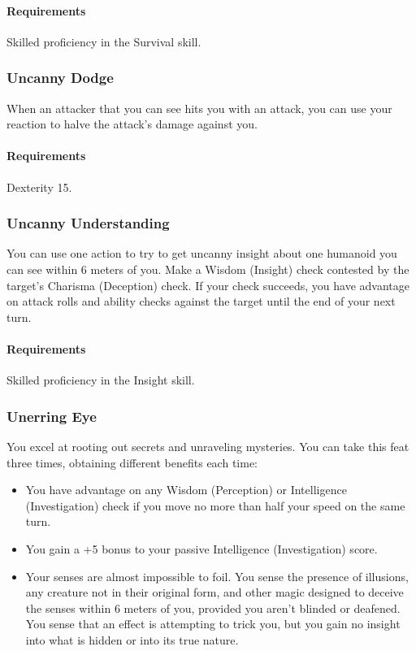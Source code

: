     \paragraph{Requirements} Skilled proficiency in the Survival skill.
\subsubsection{Uncanny Dodge} \label{feat::uncannydodge}
    When an attacker that you can see hits you with an attack, you can use your reaction to halve the attack's damage against you.
    \paragraph{Requirements} Dexterity 15.
\subsubsection{Uncanny Understanding} \label{feat::uncannyinsight}
    You can use one action to try to get uncanny insight about one humanoid you can see within 6 meters of you.
    Make a Wisdom (Insight) check contested by the target's Charisma (Deception) check.
    If your check succeeds, you have advantage on attack rolls and ability checks against the target until the end of your next turn.
    \paragraph{Requirements} Skilled proficiency in the Insight skill.
\subsubsection{Unerring Eye} \label{feat::unerringeye}
    You excel at rooting out secrets and unraveling mysteries.
    You can take this feat three times, obtaining different benefits each time:
    \begin{itemize}
        \item You have advantage on any Wisdom (Perception) or Intelligence (Investigation) check if you move no more than half your speed on the same turn.
        \item You gain a +5 bonus to your passive Intelligence (Investigation) score.
        \item Your senses are almost impossible to foil.
        You sense the presence of illusions, any creature not in their original form, and other magic designed to deceive the senses within 6 meters of you, provided you aren't blinded or deafened.
        You sense that an effect is attempting to trick you, but you gain no insight into what is hidden or into its true nature.
    \end{itemize}
